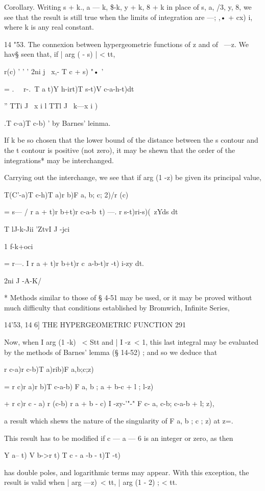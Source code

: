 Corollary. Writing s + k., a — k, \$-k, y + k, 8 + k in place of s, a,
/3, y, 8, we see that the result is still true when the limits of
integration are —; ,• + cx) i, where k is any real constant.

14 "53. The connexion between hypergeometrie functions of z and of \
—z. We hav§ seen that, if | arg ( - s) | < tt,

r(c) ' ' ' 2ni j \ x,- T c + s) "• '

= . \ \ r-.\ T a t)Y h-irt)T s-t)V c-a-h-t)dt\

'' TTi J \ x i l TTl J ~k—x i )

.T c-a)T c-b) ' by Barnes' leinma.

If k be so chosen that the lower bound of the distance between the s
contour and the t contour is positive (not zero), it may be shewn that
the order of the integrations* may be interchanged.

Carrying out the interchange, we see that if arg (1 -z) be given its
principal value,

T(C'-a)T c-h)T a)r b)F a, b; c; 2)/r (c)

= s— / r a + t)r b+t)r c-a-b~t) —. r s-t)ri-s)(~zYds dt

 T lJ-k-Jii 'ZtvI J -jci

1 f-k+oci

= r—. I r a + t)r b+t)r c~a-b-t)r -t) i-zy dt.

2ni J -A-K/

* Methods similar to those of § 4-51 may be used, or it may be proved
without much difficulty that conditions established by Bromwich,
Infinite Series, %

14'53, 14 6] THE HYPERGEOMETRIC FUNCTION 291

Now, when I arg (1 -k) \ < Stt and | I -z\ < 1, this last integral may
be evaluated by the methods of Barnes' lemma (§ 14-52) ; and so we
deduce that

r c-a)r c-b)T a)rib)F a,b;c;z)

= r c)r a)r b)T c-a-b) F a, b ; a + b-c + l ; l-z)

+ r c)r c - a) r (c-b) r a + b - c) I -zy-'"-" F c- a, c-b; c-a-b + l;
z),

a result which shews the nature of the singularity of F a, b ; c ; z)
at z=.

This result has to be modified if c — a — 6 is an integer or zero, as
then

Y a-- t) V b->r t) T c - a -b - t)T -t)

has double poles, and logarithmic terms may appear. With this
exception, the result is valid when | arg —z)\ < tt, | arg (1 - 2) ; <
tt.

